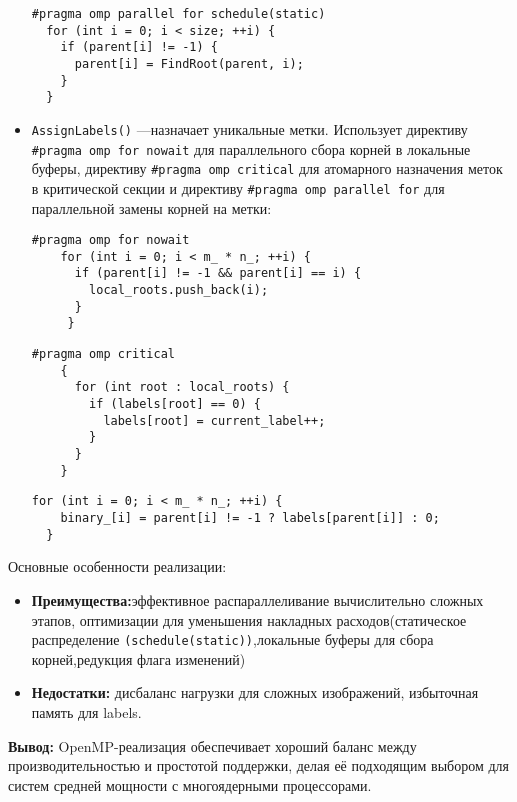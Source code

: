 \documentclass[12pt]{extarticle}
\begin{document}
\begin{itemize}
    \begin{lstlisting}[caption={Параллельное обновление родительских ссылок в методе FinalizeRoots},label={all1}]
#pragma omp parallel for schedule(static)
  for (int i = 0; i < size; ++i) {
    if (parent[i] != -1) {
      parent[i] = FindRoot(parent, i);
    }
  }
  \end{lstlisting}
  \item \texttt{AssignLabels()} —назначает уникальные метки. Использует директиву \texttt{\#pragma omp for nowait} для параллельного сбора корней в локальные буферы, директиву \texttt{\#pragma omp critical} для атомарного назначения меток в критической секции и директиву \texttt{\#pragma omp parallel for} для параллельной замены корней на метки:

    \begin{lstlisting}[caption={Параллельный сбор корней в локальные буферы в методе AssignLabels},label={all2}]
    #pragma omp for nowait
    for (int i = 0; i < m_ * n_; ++i) {
      if (parent[i] != -1 && parent[i] == i) {
        local_roots.push_back(i);
      }
     } 
  \end{lstlisting}
   \begin{lstlisting}[caption={Атомарное назначение меток в критической секции в методе AssignLabels},label={all}3]
    #pragma omp critical
    {
      for (int root : local_roots) {
        if (labels[root] == 0) {
          labels[root] = current_label++;
        }
      }
    }
  \end{lstlisting}
  \begin{lstlisting}[caption={Параллельная замена корней на метки в методе AssignLabels},label={all4}]
    for (int i = 0; i < m_ * n_; ++i) {
    binary_[i] = parent[i] != -1 ? labels[parent[i]] : 0;
  }
  \end{lstlisting}
\end{itemize}

Основные особенности реализации:
\begin{itemize}
    \item \textbf{Преимущества:}эффективное распараллеливание вычислительно сложных этапов, оптимизации для уменьшения накладных расходов(статическое распределение \texttt{(schedule(static))},локальные буферы для сбора корней,редукция флага изменений)
    \item \textbf{Недостатки:}  дисбаланс нагрузки для сложных изображений, избыточная память для labels.
\end{itemize}

\textbf{Вывод:} OpenMP-реализация обеспечивает хороший баланс между производительностью и простотой поддержки, делая её подходящим выбором для систем средней мощности с многоядерными процессорами.
\end{document}
